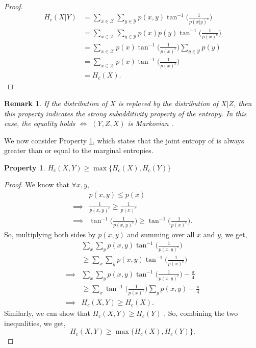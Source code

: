 \documentclass{article}
\newtheorem{prop}{Property}
\newtheorem{rem}{Remark}
\begin{document}
\begin{proof}
\begin{align*}
    H_c(X|Y) & = \sum_{x\in\mathcal{X}}\sum_{y\in\mathcal{Y}} p(x,y)\tan^{-1}\bigg(\frac{1}{p(x|y)^c}\bigg)\\
    & = \sum_{x\in\mathcal{X}}\sum_{y\in\mathcal{Y}} p(x)p(y)\tan^{-1}\bigg(\frac{1}{p(x)^c}\bigg)\\
    & = \sum_{x\in\mathcal{X}}p(x)\tan^{-1}\bigg(\frac{1}{p(x)^c}\bigg)\sum_{y\in\mathcal{Y}}p(y)\\
    & = \sum_{x\in\mathcal{X}}p(x)\tan^{-1}\bigg(\frac{1}{p(x)^c}\bigg)\\
    & = H_c(X).
\end{align*}
\end{proof}

\begin{rem}
If the distribution of $X$ is replaced by the distribution of $X|Z$, then this property indicates the strong subadditivity property of the entropy. In this case, the equality holds $\iff$ $(Y,Z,X)$ is Markovian \citep{accardi1975noncommutative}.
\end{rem}

We now consider Property \ref{p:max}, which states that the joint entropy of is always greater than or equal to the marginal entropies. 
\begin{prop}
\label{p:max}
$H_c(X,Y)\geq \max\{H_c(X),H_c(Y)\}$
\end{prop}
\begin{proof}
We know that $\forall x,y$, 
\begin{align*}
         & p(x,y) \leq p(x)\\
\implies & \frac{1}{p(x,y)^c} \geq \frac{1}{p(x)^c}\\ 
\implies & \tan^{-1}\bigg(\frac{1}{p(x,y)^c}\bigg) \geq \tan^{-1}\bigg(\frac{1}{p(x)^c}\bigg).
\end{align*}
So, multiplying both sides by $p(x,y)$ and summing over all $x$ and $y$, we get,
\begin{align*}
    & \sum_x\sum_y p(x,y) \tan^{-1}\bigg(\frac{1}{p(x,y)^c}\bigg) \\
    & \geq \sum_x\sum_y p(x,y)\tan^{-1}\bigg(\frac{1}{p(x)^c}\bigg)\\
\implies & \sum_x\sum_y p(x,y) \tan^{-1}\bigg(\frac{1}{p(x,y)^c}\bigg)-\frac{\pi}{4} \\
&\geq \sum_x \tan^{-1}\bigg(\frac{1}{p(x)^c}\bigg)\sum_yp(x,y)-\frac{\pi}{4}\\
\implies & H_c(X,Y)\geq H_c(X).
\end{align*}
Similarly, we can show that $H_c(X,Y)\geq H_c(Y)$ . So, combining the two inequalities, we get, $$H_c(X,Y)\geq \max\{H_c(X),H_c(Y)\}.$$
\end{proof}
\end{document}
